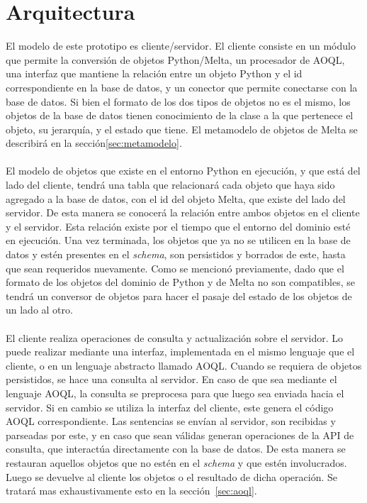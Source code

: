 \documentclass{melta}
\begin{document}
\section{Arquitectura}
\label{sec:arquitectura}
El modelo de este prototipo es cliente/servidor. El cliente consiste en un módulo que permite la conversión de objetos Python/Melta, un procesador de AOQL, una interfaz que mantiene la relación entre un objeto Python y el id correspondiente en la base de datos, y un conector que permite conectarse con la base de datos. Si bien el formato de los dos tipos de objetos no es el mismo, los objetos de la base de datos tienen conocimiento de la clase a la que pertenece el objeto, su jerarquía, y el estado que tiene. El metamodelo de objetos de Melta se describirá en la sección\ref{sec:metamodelo}.
\\\\
El modelo de objetos que existe en el entorno Python en ejecución, y que está del lado del cliente, tendrá una tabla que relacionará cada objeto que haya sido agregado a la base de datos, con el id del objeto Melta, que existe del lado del servidor. De esta manera se conocerá la relación entre ambos objetos en el cliente y el servidor. Esta relación existe por el tiempo que el entorno del dominio esté en ejecución. Una vez terminada, los objetos que ya no se utilicen en la base de datos y estén presentes en el \textit{schema}, son persistidos y borrados de este, hasta que sean requeridos nuevamente. Como se mencionó previamente, dado que el formato de los objetos del dominio de Python y de Melta no son compatibles, se tendrá un conversor de objetos para hacer el pasaje del estado de los objetos de un lado al otro.
\\\\
El cliente realiza operaciones de consulta y actualización sobre el servidor. Lo puede realizar mediante una interfaz, implementada en el mismo lenguaje que el cliente, o en un lenguaje abstracto llamado AOQL\@. Cuando se requiera de objetos persistidos, se hace una consulta al servidor. En caso de que sea mediante el lenguaje AOQL, la consulta se preprocesa para que luego sea enviada hacia el servidor. Si en cambio se utiliza la interfaz del cliente, este genera el código AOQL correspondiente. Las sentencias se envían al servidor, son recibidas y parseadas por este, y en caso que sean válidas generan operaciones de la API de consulta, que interactúa directamente con la base de datos. De esta manera se restauran aquellos objetos que no estén en el \textit{schema} y que estén involucrados. Luego se devuelve al cliente los objetos o el resultado de dicha operación. Se tratará mas exhaustivamente esto en la sección~\ref{sec:aoql}.
\end{document}
